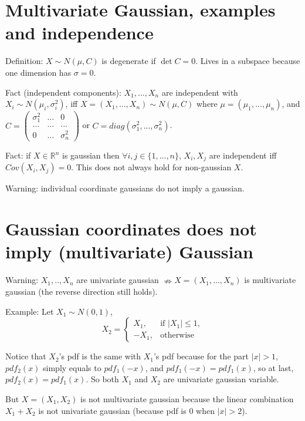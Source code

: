 \documentclass[12pt]{article}
\begin{document}
\section{Multivariate Gaussian, examples and independence}

Definition: $X\sim N(\mu,C)$ is degenerate if $\det C = 0$.
Lives in a subspace because one dimension has $\sigma=0$.

Fact (independent components): $X_1,...,X_n$ are independent
with $X_i\sim N(\mu_i,\sigma_i^2)$,
iff $X=(X_1,...,X_n)\sim N(\mu,C)$ where $\mu=(\mu_1,...,\mu_n)$,
and $C=
\begin{pmatrix}
    \sigma_1^2 & ... & 0 \\
    ... & ... & ... \\
    0 & ... & \sigma_n^2
\end{pmatrix}$
or $C=diag(\sigma_1^2,...,\sigma_n^2)$.

Fact: if $X\in\mathbb{R}^n$ is gaussian then $\forall i,j\in\{1,...,n\}$,
$X_i,X_j$ are independent iff $Cov(X_i,X_j)=0$.
This does not always hold for non-gaussian $X$.

Warning: individual coordinate gaussians
do not imply a gaussian.

\section{Gaussian coordinates does not imply (multivariate) Gaussian}

Warning: $X_1,..,X_n$ are univariate gaussian $\nRightarrow X=(X_1,...,X_n)$ is
multivariate gaussian (the reverse direction still holds).

Example: Let $X_1\sim N(0,1)$,
\begin{equation}
    X_2 = \begin{cases}
        X_1, & \text{if $|X_1|\le 1$},\\
        -X_1, & \text{otherwise}
    \end{cases}
\end{equation}

Notice that $X_2$'s pdf is the same
with $X_1$'s pdf because for the part $|x|>1$,
$pdf_2(x)$ simply equals to $pdf_1(-x)$,
and $pdf_1(-x)=pdf_1(x)$, so at last,
$pdf_2(x)=pdf_1(x)$. So both $X_1$
and $X_2$ are univariate gaussian variable.

But $X=(X_1,X_2)$ is not multivariate gaussian
because the linear combination $X_1 + X_2$ is not
univariate gaussian (because pdf is 0 when $|x|>2$).
\end{document}
